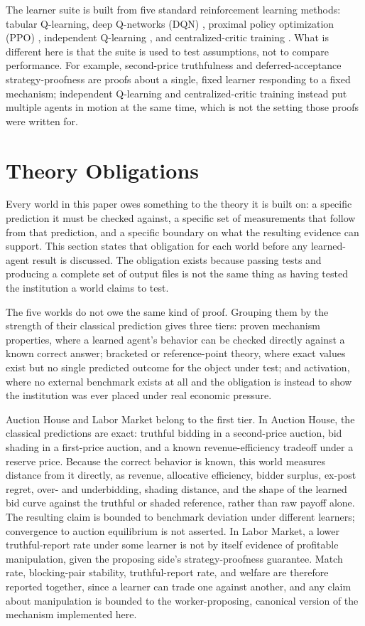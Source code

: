 \documentclass[11pt]{article}
\begin{document}
The learner suite is built from five standard reinforcement learning methods: tabular Q-learning, deep Q-networks (DQN) \citep{sutton2018,mnih2015}, proximal policy optimization (PPO) \citep{schulman2017}, independent Q-learning \citep{tan1993}, and centralized-critic training \citep{lowe2017}. What is different here is that the suite is used to test assumptions, not to compare performance. For example, second-price truthfulness and deferred-acceptance strategy-proofness are proofs about a single, fixed learner responding to a fixed mechanism; independent Q-learning and centralized-critic training instead put multiple agents in motion at the same time, which is not the setting those proofs were written for.

\section{Theory Obligations}

Every world in this paper owes something to the theory it is built on: a specific prediction it must be checked against, a specific set of measurements that follow from that prediction, and a specific boundary on what the resulting evidence can support. This section states that obligation for each world before any learned-agent result is discussed. The obligation exists because passing tests and producing a complete set of output files is not the same thing as having tested the institution a world claims to test.

The five worlds do not owe the same kind of proof. Grouping them by the strength of their classical prediction gives three tiers: proven mechanism properties, where a learned agent's behavior can be checked directly against a known correct answer; bracketed or reference-point theory, where exact values exist but no single predicted outcome for the object under test; and activation, where no external benchmark exists at all and the obligation is instead to show the institution was ever placed under real economic pressure.

Auction House and Labor Market belong to the first tier. In Auction House, the classical predictions are exact: truthful bidding in a second-price auction, bid shading in a first-price auction, and a known revenue-efficiency tradeoff under a reserve price. Because the correct behavior is known, this world measures distance from it directly, as revenue, allocative efficiency, bidder surplus, ex-post regret, over- and underbidding, shading distance, and the shape of the learned bid curve against the truthful or shaded reference, rather than raw payoff alone. The resulting claim is bounded to benchmark deviation under different learners; convergence to auction equilibrium is not asserted. In Labor Market, a lower truthful-report rate under some learner is not by itself evidence of profitable manipulation, given the proposing side's strategy-proofness guarantee. Match rate, blocking-pair stability, truthful-report rate, and welfare are therefore reported together, since a learner can trade one against another, and any claim about manipulation is bounded to the worker-proposing, canonical version of the mechanism implemented here.
\end{document}
